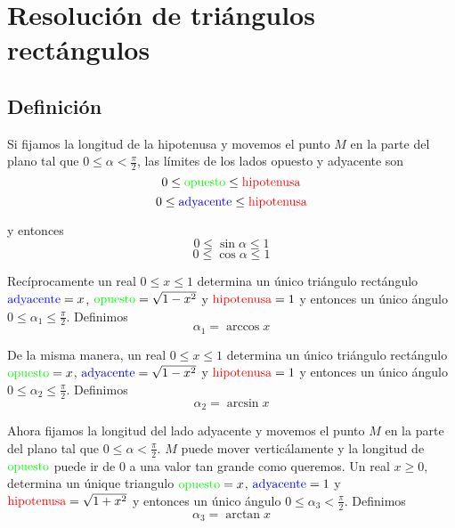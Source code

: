 \section{Resolución de triángulos rectángulos}

\subsection{Definición}

Si fijamos la longitud de la hipotenusa y movemos el punto $M$ en la parte
del plano tal que $0 \leq \alpha < \frac{\pi}{2}$,
las límites de los lados opuesto y adyacente son
$$0 \leq {\color{green}{\text{opuesto}}} \leq {\color{red}{\text{hipotenusa}}}$$
$$0 \leq {\color{blue}{\text{adyacente}}} \leq {\color{red}{\text{hipotenusa}}}$$

\begin{center}
\end{center}

y entonces
$$
0\leq \sin \alpha \leq 1
$$
$$
0\leq \cos \alpha \leq 1
$$

Recíprocamente un real $0 \leq x \leq 1$ determina un único triángulo rectángulo
${\color{blue}{\text{adyacente}}} = x$,
${\color{green}{\text{opuesto}}} = \sqrt{1-x^2}$ y
${\color{red}{\text{hipotenusa}}} = 1$ y entonces un único ángulo
$0 \leq \alpha_1 \leq \frac{\pi}{2}$. Definimos
$$
\alpha_1 = \arccos x
$$

De la misma manera, un real $0 \leq x \leq 1$ determina un único triángulo
rectángulo ${\color{green}{\text{opuesto}}} = x$,
${\color{blue}{\text{adyacente}}} = \sqrt{1-x^2}$ y
${\color{red}{\text{hipotenusa}}} = 1$ y entonces un único ángulo
$0 \leq \alpha_2 \leq \frac{\pi}{2}$. Definimos
$$
\alpha_2 = \arcsin x
$$

Ahora fijamos la longitud del lado adyacente y movemos el punto $M$ en la parte
del plano tal que $0 \leq \alpha < \frac{\pi}{2}$. $M$ puede mover
verticálamente y la longitud de
${\color{green}{\text{opuesto}}}$ puede ir de $0$ a una
valor tan grande como queremos. Un real $x \geq 0$, determina un
únique triangulo ${\color{green}{\text{opuesto}}} = x$,
${\color{blue}{\text{adyacente}}} = 1$ y
${\color{red}{\text{hipotenusa}}} = \sqrt{1+x^2}$ y entonces un 
único ángulo $0 \leq \alpha_3 < \frac{\pi}{2}$. Definimos
$$
\alpha_3 = \arctan x
$$

